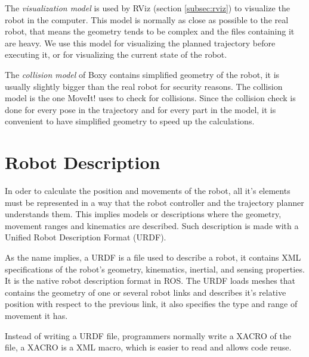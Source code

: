 The \textit{visualization model} is used by RViz (section \ref{subsec:rviz}) to visualize the robot in the computer. This model is normally as close as possible to the real robot, that means the geometry tends to be complex and the files containing it are heavy. We use this model for visualizing the planned trajectory before executing it, or for visualizing the current state of the robot.

The \textit{collision model} of Boxy contains simplified geometry of the robot, it is usually slightly bigger than the real robot for security reasons. The collision model is the one MoveIt! uses to check for collisions. Since the collision check is done for every pose in the trajectory and for every part in the model, it is convenient to have simplified geometry to speed up the calculations. 

\section{Robot Description}
\label{sec:urdf}

In oder to calculate the position and movements of the robot, all it's elements must be  represented in a way that the robot controller and the trajectory planner understands them. This implies models or descriptions where the geometry, movement ranges and kinematics are described. Such description is made with a Unified Robot Description Format (URDF).

As the name implies, a URDF is a file used to describe a robot, it contains XML specifications of the robot's geometry, kinematics, inertial, and sensing properties. It is the native robot description format in ROS. The URDF loads meshes that contains the geometry of one or several robot links and describes it's relative position with respect to the previous link, it also specifies the type and range of movement it has.

Instead of writing a URDF file, programmers normally write a XACRO of the file, a XACRO is a XML macro, which is easier to read and allows code reuse. 